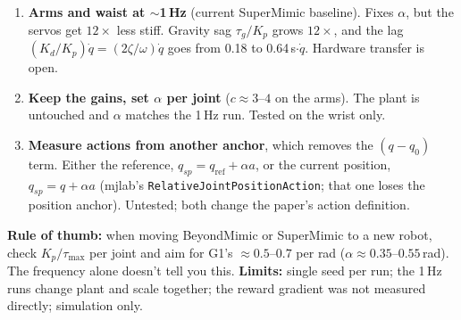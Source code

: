 \documentclass[10pt]{article}
\begin{document}
\begin{enumerate}
  \setlength{\itemsep}{1pt}
  \item \textbf{Arms and waist at $\sim$1\,Hz} (current SuperMimic baseline). Fixes $\alpha$, but the servos
  get $12\times$ less stiff. Gravity sag $\tau_g/K_p$ grows $12\times$, and the lag
  $(K_d/K_p)\dot q = (2\zeta/\omega)\dot q$ goes from 0.18 to 0.64\,s$\cdot\dot q$. Hardware transfer is open.
  \item \textbf{Keep the gains, set $\alpha$ per joint} ($c \approx 3$--$4$ on the arms). The plant is
  untouched and $\alpha$ matches the 1\,Hz run. Tested on the wrist only.
  \item \textbf{Measure actions from another anchor}, which removes the $(q-q_0)$ term. Either the reference,
  $q_{sp} = q_{\text{ref}} + \alpha a$, or the current position, $q_{sp} = q + \alpha a$ (mjlab's
  \texttt{RelativeJointPositionAction}; that one loses the position anchor). Untested; both change the
  paper's action definition.
\end{enumerate}
\textbf{Rule of thumb:} when moving BeyondMimic or SuperMimic to a new robot, check $K_p/\tau_{\max}$
per joint and aim for G1's $\approx 0.5$--$0.7$ per rad ($\alpha \approx 0.35$--$0.55$\,rad). The
frequency alone doesn't tell you this.
\textbf{Limits:} single seed per run; the 1\,Hz runs change plant and scale together; the reward
gradient was not measured directly; simulation only.
\end{document}
